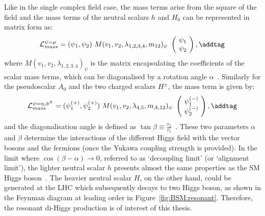 Like in the single complex field case, the mass terms arise from the square of the field and
the mass terms of the neutral scalars $h$ and $H_0$ can be represented in matrix form as:
\[
\mathcal{L}_{mass}^{ \psi = \rho }   = (\psi_1, \psi_2)\ M(v_1,v_2,\lambda_{1,2,3,4}, m_{12})_\psi\ \begin{pmatrix} 
    \psi_1 \\ \  \psi_2 \ 
    \end{pmatrix},
\addtag \]
where $M(v_1,v_2,\lambda_{1,2,3,4})_\psi$ is the matrix encapsulating the coefficients of the scalar mass terms,
which can be diagonalised by a rotation angle $\alpha$~\cite{2HDM-Branco}.
Similarly for the pseudoscalar $A_0$ and the two charged scalars $H^\pm$,
the mass term is given by:
\[
\mathcal{L}_{mass}^{ \psi = \eta, \phi^\pm }   = (\psi_1^{(+)}, \psi_2^{(+)})\ M(v_1,v_2,\lambda_{4,5}, m_{A,12})_\psi\ \begin{pmatrix} 
    \psi_1^{(-)} \\ \  \psi_2^{(-)} \ 
    \end{pmatrix},
\addtag \]
and the diagonalisation angle is defined as $\tan\beta \equiv \frac{v_2}{v_1}$~\cite{2HDM-Branco}.
These two parameters $\alpha$ and $\beta$ determine the interactions of the different Higgs
field with the vector bosons and the fermions (once the Yukawa coupling strength is provided).
In the limit where $\cos(\beta - \alpha) \rightarrow 0$, referred to as `decoupling limit' (or `alignment limit'), 
the lighter neutral scalar $h$ presents almost the same properties as the SM Higgs boson~\cite{decoupling}.
The heavier neutral scalar $H$, on the other hand, could be generated at the LHC which subsequently
decays to two Higgs boson, as shown in the Feynman diagram at leading order in 
Figure~\ref{fig:BSM:resonant}.
Therefore, the resonant di-Higgs production is of interest of this thesis. 

